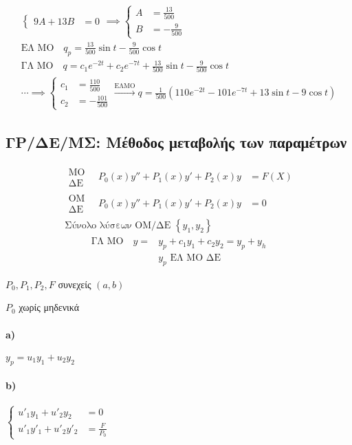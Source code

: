 \documentclass[11pt,a4paper,titlepage,final]{article}
\begin{document}
\begin{exercise*}{5.36}
\begin{gather*}
\begin{cases}
		9A+13B&=0
		\end{cases} \implies \begin{cases}
		A &= \frac{13}{500} \\
		B &= -\frac{9}{500}
		\end{cases}
		\\
		\text{ΕΛ ΜΟ} \quad q_p = \frac{13}{500}\sin t -\frac{9}{500}\cos t\\
		\text{ΓΛ ΜΟ} \quad q = c_1e^{-2t}+c_2e^{-7t}+\frac{13}{500}\sin t - \frac{9}{500}\cos t\\
		\cdots \implies \begin{cases}
		c_1 &= \frac{110}{500} \\
		c_2 &= -\frac{101}{500}
		\end{cases} \xrightarrow{\text{ΕΛΜΟ}} q = \frac{1}{500} (110e^{-2t}-101e^{-7t}+13\sin t-9\cos t)
	\end{gather*}
\end{exercise*}

\subsection{ΓΡ/ΔΕ/ΜΣ: Μέθοδος μεταβολής των παραμέτρων}
\begin{align*}
\begin{matrix}
\text{ΜΟ}\\\text{ΔΕ}\end{matrix}\quad P_0(x)y'' + P_1(x)y'+P_2(x)y &= F(X) \\
\begin{matrix}
\text{ΟΜ}\\\text{ΔΕ}\end{matrix}\quad P_0(x)y'' + P_1(x)y'+P_2(x)y &=0 \\
\text{Σύνολο λύσεων ΟΜ/ΔΕ } \left\lbrace y_1,y_2 \right\rbrace &
\end{align*}
\begin{align*}
\text{ΓΛ ΜΟ}\quad y = & y_p + c_1y_1+c_2y_2=y_p+y_h\\
& y_p \text{ ΕΛ ΜΟ ΔΕ}
\end{align*}

\(P_0,P_1,P_2,F\) συνεχείς \((a,b)\)

\(P_0 \) χωρίς μηδενικά

\paragraph{\textlatin{a})}
\(
y_p = u_1y_1+u_2y_2
\)

\paragraph{\textlatin{b})}
\(
\begin{cases}
u'_1y_1+u'_2y_2 &=0\\
u'_1y'_1+u'_2y'_2 &= \frac{F}{P_0}
\end{cases}
\)
\end{document}
